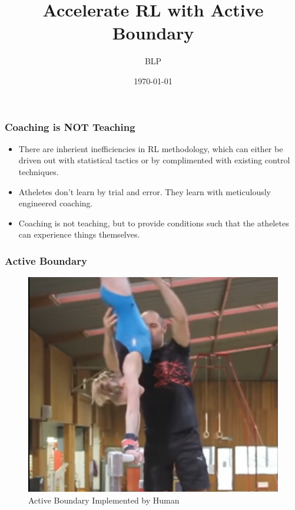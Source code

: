 \documentclass{beamer}
\title{Accelerate RL with Active Boundary}
\author{BLP}
\institute{NJUPT}
\date{\today}
\begin{document}
\begin{frame}
\titlepage
\end{frame}

\begin{frame}
\frametitle{Coaching is NOT Teaching}

	\begin{itemize}
		
		\item There are inherient inefficiencies in RL methodology, which can either be driven out with statistical tactics or by complimented with existing control techniques.

		\item Atheletes don't learn by trial and error. They learn with meticulously engineered coaching.

		\item Coaching is not teaching, but to provide conditions such that the atheletes can experience things themselves.
	\end{itemize}

\end{frame}

\begin{frame}
	\frametitle{Active Boundary}
	\begin{figure}
		\centering
		\includegraphics[scale=0.3]{training1}
		\caption{Active Boundary Implemented by Human}
	\end{figure}
\end{frame}
\end{document}
